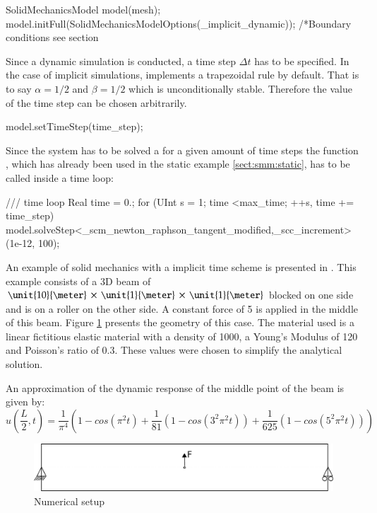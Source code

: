 \begin{cpp} 
SolidMechanicsModel model(mesh);
model.initFull(SolidMechanicsModelOptions(_implicit_dynamic)); 
/*Boundary conditions see section %
\end{cpp} 
Since a dynamic simulation is conducted, a time step $\Delta
t$ has to be specified. In the case of implicit simulations, \akantu
implements a trapezoidal rule by default.  That is to say $\alpha =
1/2$ and $\beta = 1/2$ which is unconditionally stable. Therefore the
value of the time step can be chosen arbitrarily.
\begin{cpp} 
model.setTimeStep(time_step);
\end{cpp} 
Since the system has to be solved a for a given amount of
time steps the function , which has already been
used in the static example \ref{sect:smm:static}, has to be called
inside a time loop:
\begin{cpp} 
/// time loop 
Real time = 0.; 
for (UInt s = 1; time <max_time; ++s, time += time_step) {
  model.solveStep<_scm_newton_raphson_tangent_modified,_scc_increment>(1e-12, 100); 
}
\end{cpp} 
An example of solid mechanics with a implicit time scheme is
presented in .
This example consists of a 3D beam of
$\unit{10}{\meter}\,\times\,\unit{1}{\meter}\,\times\,\unit{1}{\meter}$
blocked on one side and is on a roller on the other side.  A constant
force of \unit{5}{\kilo\newton} is applied in the middle of this beam.
Figure \ref{fig:smm:implicit:dynamic} presents the geometry of this
case. The material used is a linear fictitious elastic material with a
density of \unit{1000}{\kilogrampercubicmetre}, a Young's Modulus of
\unit{120}{\mega\pascal} and Poisson's ratio of $0.3$. These values
were chosen to simplify the analytical solution.

An approximation of the dynamic response of the middle point of the
beam is given by:
\begin{equation}
  \label{eqn:smm:implicit} 
  u\left(\frac{L}{2}, t\right)
  = \frac{1}{\pi^4} \left(1 - cos\left(\pi^2 t\right) +
    \frac{1}{81}\left(1 - cos\left(3^2 \pi^2 t\right)\right) +
    \frac{1}{625}\left(1 - cos\left(5^2 \pi^2 t\right)\right)\right)
\end{equation}

\begin{figure}[!htb] 
  \centering
  \includegraphics[scale=.6]{figures/implicit_dynamic}
  \caption{Numerical setup}
  \label{fig:smm:implicit:dynamic}
\end{figure}

